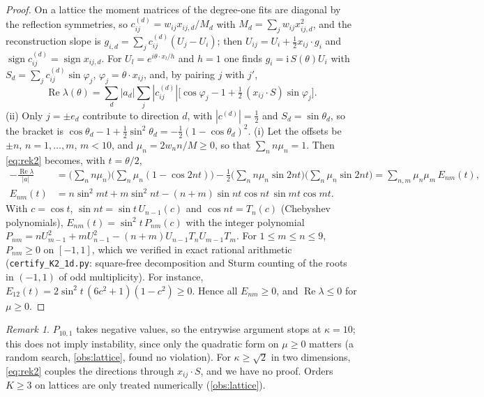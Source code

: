 \documentclass[11pt,a4paper]{article}
\theoremstyle{plain}
\theoremstyle{definition}
\theoremstyle{remark}
\newtheorem{remark}[theorem]{Remark}
\numberwithin{equation}{section}
\newcommand{\sgn}{\operatorname{sign}}
\renewcommand{\Re}{\operatorname{Re}}
\begin{document}
\begin{proof}
On a lattice the moment matrices of the degree-one fits are diagonal by the reflection symmetries, so $c^{(d)}_{ij}=w_{ij}x_{ij,d}/M_d$ with $M_d=\sum_jw_{ij}x_{ij,d}^2$, and the reconstruction slope is $g_{i,d}=\sum_jc^{(d)}_{ij}(U_j-U_i)$; then $U_{ij}=U_i+\tfrac12x_{ij}\cdot g_i$ and $\sgn c^{(d)}_{ij}=\sgn x_{ij,d}$. For $U_l=e^{i\theta\cdot x_l/h}$ and $h=1$ one finds $g_i=\mathrm{i}\,S(\theta)U_i$ with $S_d=\sum_jc^{(d)}_{ij}\sin\varphi_j$, $\varphi_j=\theta\cdot x_{ij}$, and, by pairing $j$ with $j'$,
\begin{equation}\label{eq:rek2}
\Re\lambda(\theta)=\sum_d|a_d|\sum_j|c^{(d)}_{ij}|\Big[\cos\varphi_j-1+\tfrac12\,(x_{ij}\cdot S)\sin\varphi_j\Big].
\end{equation}
(ii) Only $j=\pm e_d$ contribute to direction $d$, with $|c^{(d)}|=\tfrac12$ and $S_d=\sin\theta_d$, so the bracket is $\cos\theta_d-1+\tfrac12\sin^2\theta_d=-\tfrac12(1-\cos\theta_d)^2$.
(i) Let the offsets be $\pm n$, $n=1,\dots,m$, $m<10$, and $\mu_n=2w_nn/M\ge0$, so that $\sum_n n\mu_n=1$. Then \eqref{eq:rek2} becomes, with $t=\theta/2$,
\[
\begin{aligned}
-\frac{\Re\lambda}{|a|}&=\Big(\sum_nn\mu_n\Big)\Big(\sum_n\mu_n(1-\cos 2nt)\Big)-\tfrac12\Big(\sum_nn\mu_n\sin2nt\Big)\Big(\sum_n\mu_n\sin2nt\Big)
=\sum_{n,m}\mu_n\mu_m\,E_{nm}(t),\\
E_{nm}(t)&=n\sin^2mt+m\sin^2nt-(n+m)\sin nt\cos nt\,\sin mt\cos mt .
\end{aligned}
\]
With $c=\cos t$, $\sin nt=\sin t\,U_{n-1}(c)$ and $\cos nt=T_n(c)$ (Chebyshev polynomials), $E_{nm}(t)=\sin^2t\,P_{nm}(c)$ with the integer polynomial $P_{nm}=nU_{m-1}^2+mU_{n-1}^2-(n+m)U_{n-1}T_nU_{m-1}T_m$. For $1\le m\le n\le9$, $P_{nm}\ge0$ on $[-1,1]$, which we verified in exact rational arithmetic (\texttt{certify\_K2\_1d.py}: square-free decomposition and Sturm counting of the roots in $(-1,1)$ of odd multiplicity). For instance, $E_{12}(t)=2\sin^2t\,(6c^2+1)(1-c^2)\ge0$. Hence all $E_{nm}\ge0$, and $\Re\lambda\le0$ for $\mu\ge0$.
\end{proof}

\begin{remark}\label{rem:k2limits}
$P_{10,1}$ takes negative values, so the entrywise argument stops at $\kappa=10$; this does not imply instability, since only the quadratic form on $\mu\ge0$ matters (a random search, \cref{obs:lattice}, found no violation). For $\kappa\ge\sqrt2$ in two dimensions, \eqref{eq:rek2} couples the directions through $x_{ij}\cdot S$, and we have no proof. Orders $K\ge3$ on lattices are only treated numerically (\cref{obs:lattice}).
\end{remark}
\end{document}
